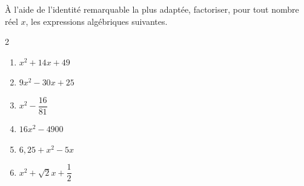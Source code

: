\begin{exo}
	À l'aide de l'identité remarquable la plus adaptée, factoriser, pour tout nombre réel $x$, les expressions algébriques suivantes.
	\vspace*{-2mm}
	\begin{multicols}{2}
		\begin{enumerate}[label=\alph*)]
			\item $x^2 + 14x + 49$
			\item $9x^2 - 30x + 25$
			\item $x^2 - \dfrac{16}{81}$
			\item $16x^2 - 4900$
			\item $6,25 + x^2 - 5x$
			\item $x^2 + \sqrt{2}x + \dfrac{1}{2}$
		\end{enumerate}
	\end{multicols}
\end{exo}
